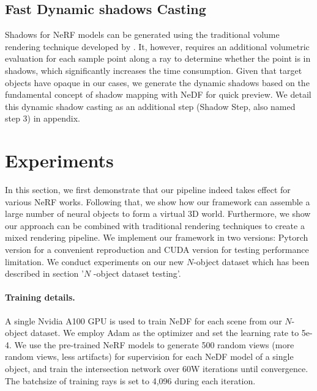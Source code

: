 \documentclass[letterpaper]{article} %
\begin{document}
\subsection{Fast Dynamic shadows Casting}
Shadows for NeRF models can be generated using the traditional volume rendering technique developed by \cite{max1995optical}. It, however, requires an additional volumetric evaluation for each sample point along a ray to determine whether the point is in shadows, which significantly increases the time consumption. 
Given that target objects have opaque in our cases, we generate the dynamic shadows based on the fundamental concept of shadow mapping \cite{williams1978casting} with NeDF for quick preview. We detail this dynamic shadow casting as an additional step (Shadow Step, also named step 3) in appendix.

\section{Experiments}
In this section, we first demonstrate that our pipeline indeed takes effect for various NeRF works. Following that, we show how our framework can assemble a large number of neural objects to form a virtual 3D world. Furthermore, we show our approach can be combined with traditional rendering techniques to create a mixed rendering pipeline. We implement our framework in two versions: Pytorch version for a convenient reproduction and CUDA version for testing performance limitation. We conduct experiments on our new $N$-object dataset which has been described in section '$N$ -object dataset testing'.
\paragraph{Training details.}A single Nvidia A100 GPU is used to train NeDF for each scene from our $N$-object dataset. We employ Adam as the optimizer and set the learning rate to 5e-4. We use the pre-trained NeRF models to generate 500 random views (more random views, less artifacts) for supervision for each NeDF model of a single object, and train the intersection network over 60W iterations until convergence. The batchsize of training rays is set to 4,096 during each iteration.
\end{document}
